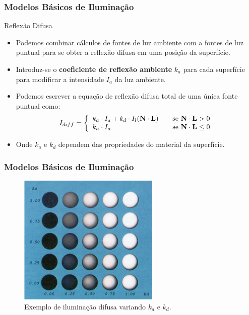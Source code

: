\documentclass{beamer}
\begin{document}
\begin{frame}
\frametitle{Modelos Básicos de Iluminação}

	\begin{block}{Reflexão Difusa}
		\begin{itemize}
			\item Podemos combinar cálculos de fontes de luz ambiente com a fontes de luz puntual para se obter a reflexão difusa em uma posição da superfície.
			\item Introduz-se o \textbf{coeficiente de reflexão ambiente} $k_a$ para cada superfície para modificar a intensidade $I_a$ da luz ambiente.
			\item Podemos escrever a equação de reflexão difusa total de uma única fonte puntual como:
				\begin{equation*}
					I_{diff} = \left\{
					\begin{array}{l l}
   						 k_a \cdot I_a + k_d \cdot I_l(\textbf{N} \cdot \textbf{L}) & \quad \text{se } \textbf{N} \cdot \textbf{L} > 0\\
    						k_a \cdot I_a & \quad \text{se } \textbf{N} \cdot \textbf{L} \leq 0 
  					\end{array} \right.
				\end{equation*}		
			\item Onde $k_a$ e $k_d$ dependem das propriedades do material da superfície.		
		\end{itemize}
	\end{block}

\end{frame}



\begin{frame}
\frametitle{Modelos Básicos de Iluminação}

	\begin{figure}[!h]
		\begin{center}
		\includegraphics[width=0.6\textwidth]{Figures/RefKaKd}
		\caption{Exemplo de iluminação difusa variando $k_a$  e $k_d$.}
		\end{center}
	\end{figure}	

\end{frame}
\end{document}
